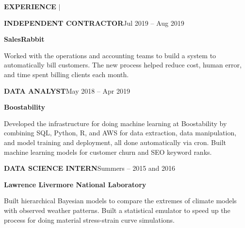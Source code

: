 \documentclass[12pt]{article}
\newcommand{\entrypar}[5]{
    \textbf{\MakeUppercase{#1}}\hfill #3 -- #4

    \textbf{#2}

    #5
    }
\begin{document}
\begin{minipage}[t]{0.19\textwidth}
    \begin{flushright}
        \textbf{EXPERIENCE} $\vert$ \ \
    \end{flushright}
\end{minipage}%
%
\begin{minipage}[t]{0.81\textwidth}
    \begin{flushleft}

        \entrypar{Independent Contractor}{SalesRabbit}{Jul 2019}{Aug 2019}{
Worked with the operations and accounting teams to build a system to automatically bill customers.
The new process helped reduce cost, human error, and time spent billing clients each month.
        }

        \bigskip

        \entrypar{Data analyst}{Boostability}{May 2018}{Apr 2019}{
Developed the infrastructure for doing machine learning at Boostability by combining SQL, Python, R, and AWS for data extraction, data manipulation, and model training and deployment, all done automatically via cron.
Built machine learning models for customer churn and SEO keyword ranks.

        }

        \bigskip

        \entrypar{Data science intern}{Lawrence Livermore National Laboratory}{Summers}{2015 and 2016}{
Built hierarchical Bayesian models to compare the extremes of climate models with observed weather patterns.
Built a statistical emulator to speed up the process for doing material stress-strain curve simulations.

        }

    \end{flushleft}
\end{minipage}
\end{document}
